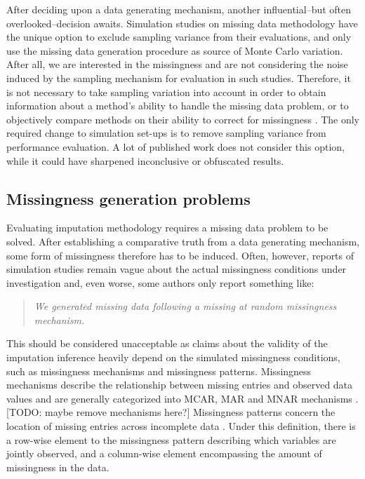 \documentclass[bimj,fleqn]{w-art}
\begin{document}
After deciding upon a data generating mechanism, another influential--but often overlooked--decision awaits. Simulation studies on missing data methodology have the unique option to exclude sampling variance from their evaluations, and only use the missing data generation procedure as source of Monte Carlo variation. After all, we are interested in the missingness and are not considering the noise induced by the sampling mechanism for evaluation in such studies. Therefore, it is not necessary to take sampling variation into account in order to obtain information about a method's ability to handle the missing data problem, or to objectively compare methods on their ability to correct for missingness \citep[see for a detailed discussion][]{vink14}. The only required change to simulation set-ups is to remove sampling variance from performance evaluation. A lot of published work does not consider this option, while it could have sharpened inconclusive or obfuscated results.  




\subsection{Missingness generation problems}

Evaluating imputation methodology requires a missing data problem to be solved. After establishing a comparative truth from a data generating mechanism, some form of missingness therefore has to be induced. Often, however, reports of simulation studies remain vague about the actual missingness conditions under investigation and, even worse, some authors only report something like:
\begin{quote}
\textit{We generated missing data following a missing at random missingness mechanism.}
\end{quote}
This should be considered unacceptable as claims about the validity of the imputation inference heavily depend on the simulated missingness conditions, such as missingness mechanisms and missingness patterns. Missingness mechanisms describe the relationship between missing entries and observed data values and are generally categorized into MCAR, MAR and MNAR mechanisms \citep[][see Table \ref{table:mech}]{rubi76}. [TODO: maybe remove mechanisms here?] Missingness patterns concern the location of missing entries across incomplete data \citep[][p. 8]{litt20}. Under this definition, there is a row-wise element to the missingness pattern describing which variables are jointly observed, and a column-wise element encompassing the amount of missingness in the data. 
\end{document}
